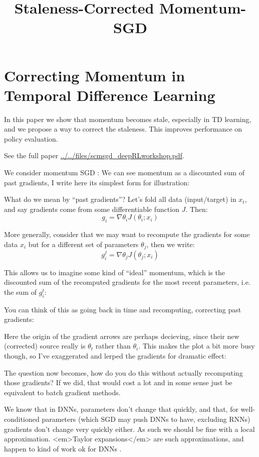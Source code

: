 
\title{Staleness-Corrected Momentum-SGD}

\section{Correcting Momentum in Temporal Difference Learning}

In this paper we show that momentum becomes stale, especially in TD learning, and we propose a way to correct the staleness. This improves performance on policy evaluation.

See the full paper \href{here}{../../files/scmsgd_deepRLworkshop.pdf}.

We consider momentum SGD \cite{polyak1964some}:
We can see momentum as a discounted sum of past gradients, I write here its simplest form for illustration:

What do we mean by ``past gradients''? Let's fold all data (input/target) in $x_t$, and say gradients come from some differentiable function $J$. Then:
$$g_i = \nabla \theta_i J(\theta_i; x_i)$$

More generally, consider that we may want to recompute the gradients for some data $x_i$ but for a different set of parameters $\theta_j$, then we write:
$$g^j_i = \nabla \theta_j J(\theta_j; x_i)$$

This allows us to imagine some kind of ``ideal'' momentum, which is the discounted sum of the recomputed gradients for the most recent parameters, i.e. the sum of $g^t_i$:

You can think of this as going back in time and recomputing, correcting past gradients:

Here the origin of the gradient arrows are perhaps decieving, since their new (corrected) source really is $\theta_t$ rather than $\theta_i$. This makes the plot a bit more busy though, so I've exaggerated and lerped the gradients for dramatic effect:


The question now becomes, how do you do this without actually recomputing those gradients? If we did, that would cost a lot and in some sense just be equivalent to batch gradient methods.


We know that in DNNs, parameters don't change that quickly, and that, for well-conditioned parameters (which SGD may push DNNs to have, excluding RNNs) gradients don't change very quickly either. As such we should be fine with a local approximation. <em>Taylor expansions</em> are such approximations, and happen to kind of work ok for DNNs \cite{balduzzi2017neural}.


